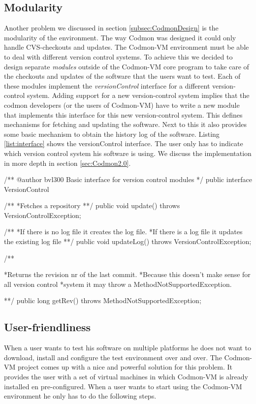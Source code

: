 \documentclass{article}
\newcommand{\project}{Codmon-VM}
\begin{document}
\subsection{Modularity}
\label{road:modular}
Another problem we discussed in section \ref{subsec:CodmonDesign} is the modularity of the environment. The way Codmon was designed it could only handle CVS-checkouts and updates. The \project{} 
environment must be able to deal with different version control systems. To achieve this we decided to design separate \emph{modules} outside of the \project{} core program to take care of the checkouts and updates of the 
software that the users want to test. Each of these modules implement the \emph{versionControl} interface for a different version-control system. Adding support for a new version-control system implies that the codmon developers 
(or the users of \project{}) have to write a new module that implements this interface for this new version-control system. This defines mechanisms for fetching and updating the software. Next to this it 
also provides some basic mechanism to obtain the history log of the software. Listing \ref{list:interface} shows the versionControl interface. The user only has to indicate which version control system his 
software is using. We discuss the implementation in more depth in section \ref{sec:Codmon2.0}.\\

\begin{code}[frame=shadowbox, language=Java,showstringspaces=false]
/**
@author bvl300 
Basic interface for version control modules
*/
public interface VersionControl{
	
	/**
	*Fetches a repository
	**/
	public void update() throws VersionControlException;
	
	/**
	*If there is no log file it creates the log file. 
	*If there is a log file it updates the existing log file
	**/
	public void updateLog() throws VersionControlException;


	/**

	*Returns the revision nr of the last commit.
	*Because this doesn't make sense for all version control
	*system it may throw a MethodNotSupportedException.

	**/
	public long getRev() throws MethodNotSupportedException;
}
\end{code}


\subsection{User-friendliness}
\label{road:user}
When a user wants to test his software on multiple platforms he does not want to download, install and configure the test environment over and over. The \project{} project comes up with a nice and powerful 
solution for this problem. It provides the user with a set of virtual machines in which \project{} is already installed en pre-configured. When a user wants to start using the \project{} environment he only 
has to do the following steps.
\end{document}
